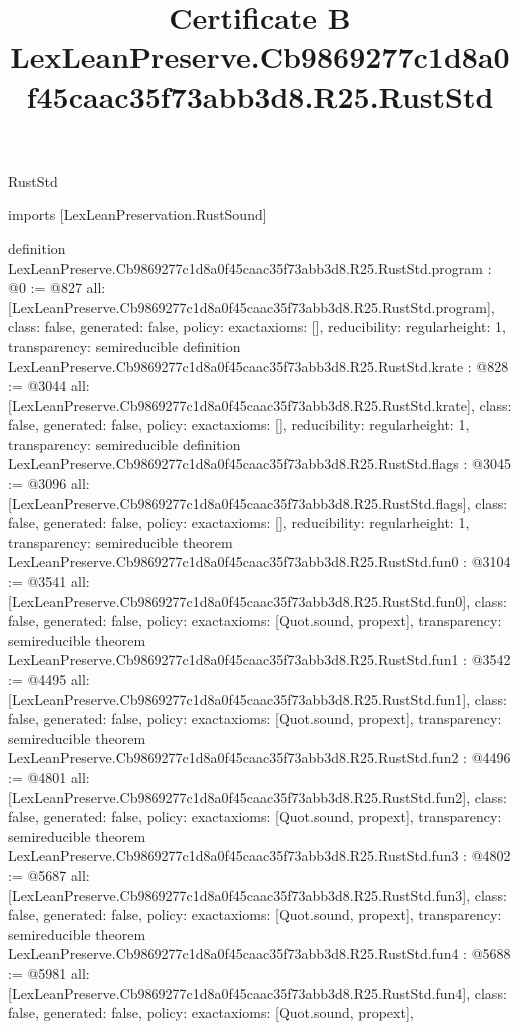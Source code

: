 \begin{lexlean}{RustStd}
\title{Certificate B LexLeanPreserve.Cb9869277c1d8a0f45caac35f73abb3d8.R25.RustStd}
\begin{coremodule}
imports [LexLeanPreservation.RustSound]

definition LexLeanPreserve.Cb9869277c1d8a0f45caac35f73abb3d8.R25.RustStd.program : @0 := @827 {
  all: [LexLeanPreserve.Cb9869277c1d8a0f45caac35f73abb3d8.R25.RustStd.program],
  class: false,
  generated: false,
  policy: exact{axioms: []},
  reducibility: regular{height: 1},
  transparency: semireducible
}
definition LexLeanPreserve.Cb9869277c1d8a0f45caac35f73abb3d8.R25.RustStd.krate : @828 := @3044 {
  all: [LexLeanPreserve.Cb9869277c1d8a0f45caac35f73abb3d8.R25.RustStd.krate],
  class: false,
  generated: false,
  policy: exact{axioms: []},
  reducibility: regular{height: 1},
  transparency: semireducible
}
definition LexLeanPreserve.Cb9869277c1d8a0f45caac35f73abb3d8.R25.RustStd.flags : @3045 := @3096 {
  all: [LexLeanPreserve.Cb9869277c1d8a0f45caac35f73abb3d8.R25.RustStd.flags],
  class: false,
  generated: false,
  policy: exact{axioms: []},
  reducibility: regular{height: 1},
  transparency: semireducible
}
theorem LexLeanPreserve.Cb9869277c1d8a0f45caac35f73abb3d8.R25.RustStd.fun0 : @3104 := @3541 {
  all: [LexLeanPreserve.Cb9869277c1d8a0f45caac35f73abb3d8.R25.RustStd.fun0],
  class: false,
  generated: false,
  policy: exact{axioms: [Quot.sound, propext]},
  transparency: semireducible
}
theorem LexLeanPreserve.Cb9869277c1d8a0f45caac35f73abb3d8.R25.RustStd.fun1 : @3542 := @4495 {
  all: [LexLeanPreserve.Cb9869277c1d8a0f45caac35f73abb3d8.R25.RustStd.fun1],
  class: false,
  generated: false,
  policy: exact{axioms: [Quot.sound, propext]},
  transparency: semireducible
}
theorem LexLeanPreserve.Cb9869277c1d8a0f45caac35f73abb3d8.R25.RustStd.fun2 : @4496 := @4801 {
  all: [LexLeanPreserve.Cb9869277c1d8a0f45caac35f73abb3d8.R25.RustStd.fun2],
  class: false,
  generated: false,
  policy: exact{axioms: [Quot.sound, propext]},
  transparency: semireducible
}
theorem LexLeanPreserve.Cb9869277c1d8a0f45caac35f73abb3d8.R25.RustStd.fun3 : @4802 := @5687 {
  all: [LexLeanPreserve.Cb9869277c1d8a0f45caac35f73abb3d8.R25.RustStd.fun3],
  class: false,
  generated: false,
  policy: exact{axioms: [Quot.sound, propext]},
  transparency: semireducible
}
theorem LexLeanPreserve.Cb9869277c1d8a0f45caac35f73abb3d8.R25.RustStd.fun4 : @5688 := @5981 {
  all: [LexLeanPreserve.Cb9869277c1d8a0f45caac35f73abb3d8.R25.RustStd.fun4],
  class: false,
  generated: false,
  policy: exact{axioms: [Quot.sound, propext]},
}
\end{coremodule}
\end{lexlean}
